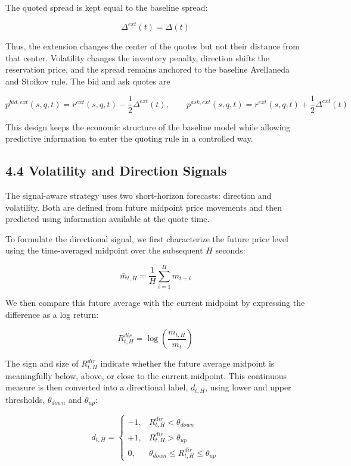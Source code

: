 \documentclass[12pt,a4paper]{article}
\begin{document}
The quoted spread is kept equal to the baseline spread:

\[
\Delta^{ext}(t)=\Delta(t)
\]

Thus, the extension changes the center of the quotes but not their
distance from that center. Volatility changes the inventory penalty,
direction shifts the reservation price, and the spread remains anchored
to the baseline Avellaneda and Stoikov rule. The bid and ask quotes are

\[
p^{bid,ext}(s,q,t)=r^{ext}(s,q,t)-\frac{1}{2}\Delta^{ext}(t), \qquad p^{ask,ext}(s,q,t)=r^{ext}(s,q,t)+\frac{1}{2}\Delta^{ext}(t)
\]

This design keeps the economic structure of the baseline model while
allowing predictive information to enter the quoting rule in a
controlled way.

\subsection{4.4 Volatility and Direction
Signals}\label{volatility-and-direction-signals}

The signal-aware strategy uses two short-horizon forecasts: direction
and volatility. Both are defined from future midpoint price movements
and then predicted using information available at the quote time.

To formulate the directional signal, we first characterize the future
price level using the time-averaged midpoint over the subsequent \(H\)
seconds:

\[
\bar{m}_{t,H} = \frac{1}{H}\sum_{i=1}^{H}m_{t+i}
\]

We then compare this future average with the current midpoint by
expressing the difference as a log return:

\[
R^{dir}_{t,H} = \log\left(\frac{\bar{m}_{t,H}}{m_t}\right)
\]

The sign and size of \(R^{dir}_{t,H}\) indicate whether the future
average midpoint is meaningfully below, above, or close to the current
midpoint. This continuous measure is then converted into a directional
label, \(d_{t,H}\), using lower and upper thresholds, \(\theta_{down}\)
and \(\theta_{up}\):

\[
d_{t,H} = \begin{cases} 
-1, & R^{dir}_{t,H} < \theta_{down} \\ 
+1, & R^{dir}_{t,H} > \theta_{up} \\ 
0, & \theta_{down} \le R^{dir}_{t,H} \le \theta_{up} 
\end{cases}
\]
\end{document}
